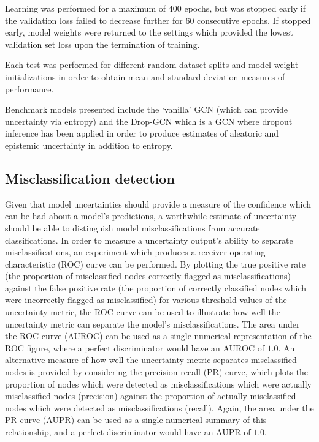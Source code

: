 \documentclass[
twocolumn,
]{ceurart}
\begin{document}
Learning was performed for a maximum of 400 epochs, but was stopped early if the validation loss failed to decrease further for 60 consecutive epochs.
If stopped early, model weights were returned to the settings which provided the lowest validation set loss upon the termination of training.
    
Each test was performed for different random dataset splits and model weight initializations in order to obtain mean and standard deviation measures of performance.

Benchmark models presented include the `vanilla' GCN (which can provide uncertainty via entropy) and the Drop-GCN which is a GCN where dropout inference has been applied in order to produce estimates of aleatoric and epistemic uncertainty in addition to entropy.

\subsection{Misclassification detection}

Given that model uncertainties should provide a measure of the confidence which can be had about a model's predictions, a worthwhile estimate of uncertainty should be able to distinguish model misclassifications from accurate classifications.
In order to measure a uncertainty output's ability to separate misclassifications, an experiment which produces a receiver operating characteristic (ROC) curve can be performed.
By plotting the true positive rate (the proportion of misclassified nodes correctly flagged as misclassifications) against the false positive rate (the proportion of correctly classified nodes which were incorrectly flagged as misclassified) for various threshold values of the uncertainty metric, the ROC curve can be used to illustrate how well the uncertainty metric can separate the model's misclassifications.
The area under the ROC curve (AUROC) can be used as a single numerical representation of the ROC figure, where a perfect discriminator would have an AUROC of $1.0$.
An alternative measure of how well the uncertainty metric separates misclassified nodes is provided by considering the precision-recall (PR) curve, which plots the proportion of nodes which were detected as misclassifications which were actually misclassified nodes (precision) against the proportion of actually misclassified nodes which were detected as misclassifications (recall).
Again, the area under the PR curve (AUPR) can be used as a single numerical summary of this relationship, and a perfect discriminator would have an AUPR of $1.0$.
\end{document}
